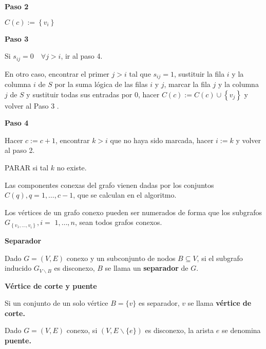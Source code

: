 \documentclass[openany]{book}
\begin{document}
\begin{center}
  \textbf{Paso 2}
\end{center}

$C(c):=\left\{v_{i}\right\}$


\begin{center}
  \textbf{Paso 3}
\end{center}

Si $s_{i j}=0 \quad \forall j>i$, ir al paso 4.

En otro caso, encontrar el primer $j>i$ tal que $s_{i j}=1$, sustituir la fila $i$ y la columna $i$ de $S$ por la suma lógica de las filas $i$ y $j$, marcar la fila $j$ y la columna $j$ de $S$ y sustituir todas sus entradas por 0, hacer $C(c):=C(c) \cup\left\{v_{j}\right\}$ y volver al Paso 3 .


\begin{center}
  \textbf{Paso 4}
\end{center}

Hacer $c:=c+1$, encontrar $k>i$ que no haya sido marcada, hacer $i:=k$ y volver al paso 2.

PARAR si tal $k$ no existe.

Las componentes conexas del grafo vienen dadas por los conjuntos $C(q), q=1, \ldots, c-1$, que se calculan en el algoritmo.


\begin{proposition}
  Los vértices de un grafo conexo pueden ser numerados de forma que los subgrafos $G_{\left\{v_{1}, \ldots, v_{i}\right\}}, i=$ $1, \ldots, n$, sean todos grafos conexos.
\end{proposition}


\begin{definition} { \color{turquoise} \textbf{Separador}}

  Dado $G=(V, E)$ conexo y un subconjunto de nodos $B \subseteq V$, si el subgrafo inducido $G_{V \backslash B}$ es disconexo, $B$ se llama un \textbf{separador} de $G$.
\end{definition}

\begin{definition}
  { \color{turquoise} \textbf{Vértice de corte y puente}}


  Si un conjunto de un solo vértice $B=\{v\}$ es separador, $v$ se llama \textbf{vértice de corte.}

  Dado $G=(V, E)$ conexo, si $(V, E \backslash\{e\})$ es disconexo, la arista $e$ se denomina \textbf{puente.}
\end{definition}
\end{document}
